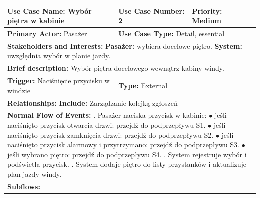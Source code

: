 \documentclass[12pt,a4paper]{article}
\begin{document}
\begin{table}[h!]
\centering
\begin{tabular}{|p{}|p{}|p{}|}
\hline
\textbf{Use Case Name:} Wybór piętra w kabinie & \textbf{Use Case Number:} 2 & \textbf{Priority:} Medium \\ \hline
\textbf{Primary Actor:} Pasażer & \multicolumn{2}{l|}{\textbf{Use Case Type:} Detail, essential} \\ \hline
\multicolumn{3}{|p{0.9\textwidth}|}{\textbf{Stakeholders and Interests:} \newline
\textbf{Pasażer:} wybiera docelowe piętro. \newline
\textbf{System:} uwzględnia wybór w planie jazdy.} \\ \hline
\multicolumn{3}{|p{0.9\textwidth}|}{\textbf{Brief description:} Wybór piętra docelowego wewnątrz kabiny windy.} \\ \hline
\textbf{Trigger:} Naciśnięcie przycisku w windzie & \multicolumn{2}{l|}{\textbf{Type:} External} \\ \hline
\multicolumn{3}{|p{0.9\textwidth}|}{\textbf{Relationships:} \newline
\textbf{Include:} Zarządzanie kolejką zgłoszeń} \\ \hline
\multicolumn{3}{|p{0.9\textwidth}|}{\textbf{Normal Flow of Events:} \newline
1. Pasażer naciska przycisk w kabinie: \newline
\hspace*{10pt} $\bullet$ jeśli naciśnięto przycisk otwarcia drzwi: przejdź do podprzepływu S1. \newline
\hspace*{10pt} $\bullet$ jeśli naciśnięto przycisk zamknięcia drzwi: przejdź do podprzepływu S2. \newline
\hspace*{10pt} $\bullet$ jeśli naciśnięto przycisk alarmowy i przytrzymano: przejdź do podprzepływu S3. \newline
\hspace*{10pt} $\bullet$ jeśli wybrano piętro: przejdź do podprzepływu S4. \newline
2. System rejestruje wybór i podświetla przycisk. \newline
3. System dodaje piętro do listy przystanków i aktualizuje plan jazdy windy. \newline
} \\ \hline
\multicolumn{3}{|p{0.9\textwidth}|}{\textbf{Subflows:} \newline
}
\end{tabular}
\end{table}
\end{document}

